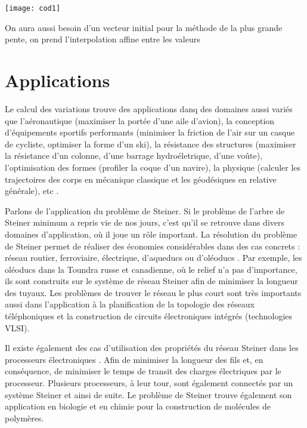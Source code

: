 \documentclass[10pt,a4paper]{article}%
\theoremstyle{theorem}
\theoremstyle{definition}
\begin{document}
	 \begin{center}
	 	\texttt{[image: cod1]}
	 \end{center}
	
	On aura aussi besoin d'un vecteur initial pour la méthode de la plus grande pente, on prend l'interpolation affine entre les valeurs 
	
	
	
	
	
	
	
	\section{Applications}
	
	Le calcul des variations trouve des applications danq des domaines aussi variés que l'aéronautique (maximiser la portée d'une aile d'avion), la conception d'équipements sportifs performants (minimiser la friction de l'air sur un casque de cycliste, optimiser la forme d'un ski), la résistance des structures (maximiser la résistance d'un colonne, d'une barrage hydroéletrique, d'une voûte), l'optimisation des formes (profiler la coque d'un navire), la physique (calculer les trajectoires des corps en mécanique classique et les géodésiques en relative générale), etc \cite{Weinstock52}.
	
	
	Parlons de l'application du problème de Steiner. Si le problème de l’arbre de Steiner minimum a repris vie de nos	jours, c’est qu’il se retrouve dans divers domaines d’application, où il
	joue un rôle important. La résolution du problème de Steiner permet de réaliser des économies considérables dans des cas concrets : réseau routier, ferroviaire, électrique, d’aqueducs	ou d’oléoducs \cite{brazil}. Par exemple, les oléoducs dans la Toundra russe et canadienne, où le relief n'a pas d'importance, ils sont construits sur le système de réseau Steiner afin de minimiser la longueur des tuyaux. Les problèmes de trouver le réseau le plus court sont très importants aussi dans l'application à la planification de la topologie des réseaux téléphoniques et la construction de circuits électroniques intégrés (technologies VLSI).
	
	Il existe également des cas d'utilisation des propriétés du réseau Steiner dans les processeurs électroniques \cite{brazil}. Afin de minimiser la longueur des fils et, en conséquence, de minimiser le temps de transit des charges électriques par le processeur. Plusieurs processeurs, à leur tour, sont également connectés par un système Steiner et ainsi de suite. Le problème de Steiner trouve également son application en biologie et en chimie pour la construction de molécules de polymères.
	
\end{document}
